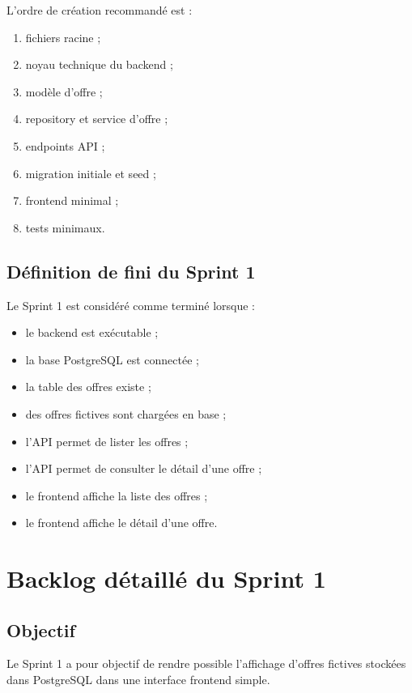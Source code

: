 \documentclass[11pt,a4paper]{article}
\begin{document}
L’ordre de création recommandé est :

\begin{enumerate}
    \item fichiers racine ;
    \item noyau technique du backend ;
    \item modèle d’offre ;
    \item repository et service d’offre ;
    \item endpoints API ;
    \item migration initiale et seed ;
    \item frontend minimal ;
    \item tests minimaux.
\end{enumerate}

\subsection{Définition de fini du Sprint 1}

Le Sprint 1 est considéré comme terminé lorsque :

\begin{itemize}
    \item le backend est exécutable ;
    \item la base PostgreSQL est connectée ;
    \item la table des offres existe ;
    \item des offres fictives sont chargées en base ;
    \item l’API permet de lister les offres ;
    \item l’API permet de consulter le détail d’une offre ;
    \item le frontend affiche la liste des offres ;
    \item le frontend affiche le détail d’une offre.
\end{itemize}

\section{Backlog détaillé du Sprint 1}

\subsection{Objectif}

Le Sprint 1 a pour objectif de rendre possible l’affichage d’offres fictives stockées dans PostgreSQL dans une interface frontend simple.
\end{document}
